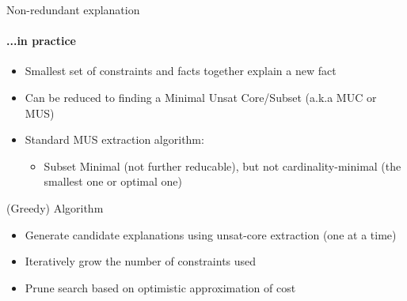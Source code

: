\documentclass{beamer}
\begin{document}
\begin{frame}{Non-redundant explanation}
    \framesubtitle{...in practice}
    \vfill
    \begin{itemize}
            \item Smallest set of constraints and facts together explain a new fact
            \vfill
            \item Can be reduced to finding a Minimal Unsat Core/Subset (a.k.a MUC or MUS)
            \vfill
                \item Standard MUS extraction algorithm:
                \begin{itemize}
                    \item Subset Minimal (not further reducable), but not cardinality-minimal (the smallest one or optimal one)
                \end{itemize}
            \end{itemize}
            \vfill
\end{frame}

\begin{frame}{(Greedy) Algorithm}

    
    \begin{itemize}
            \item Generate candidate explanations using unsat-core extraction (one at a time)
            \item Iteratively grow the number of constraints used
            \item Prune search based on optimistic approximation of cost
    \end{itemize}
 
\end{frame}
\end{document}
